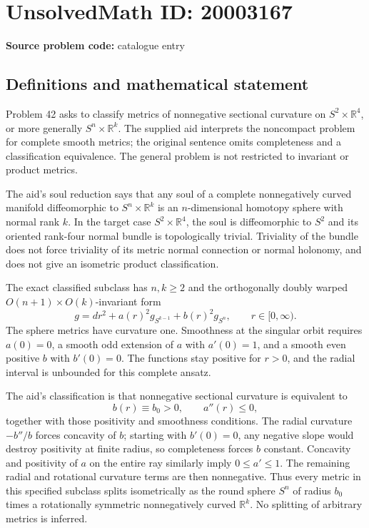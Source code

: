 \documentclass[11pt]{article}
\newcommand{\R}{\mathbb{R}}
\begin{document}
\section*{UnsolvedMath ID: 20003167}
\textbf{Source problem code:} catalogue entry
\subsection{Definitions and mathematical statement}
Problem 42 asks to classify metrics of nonnegative sectional curvature on $S^2\times\R^4$, or more generally $S^n\times\R^k$. The supplied aid interprets the noncompact problem for complete smooth metrics; the original sentence omits completeness and a classification equivalence. The general problem is not restricted to invariant or product metrics.

The aid's soul reduction says that any soul of a complete nonnegatively curved manifold diffeomorphic to $S^n\times\R^k$ is an $n$-dimensional homotopy sphere with normal rank $k$. In the target case $S^2\times\R^4$, the soul is diffeomorphic to $S^2$ and its oriented rank-four normal bundle is topologically trivial. Triviality of the bundle does not force triviality of its metric normal connection or normal holonomy, and does not give an isometric product classification.

The exact classified subclass has $n,k\geq2$ and the orthogonally doubly warped $O(n+1)\times O(k)$-invariant form
\[
 g=dr^2+a(r)^2g_{S^{k-1}}+b(r)^2g_{S^n},\qquad r\in[0,\infty).
\]
The sphere metrics have curvature one. Smoothness at the singular orbit requires $a(0)=0$, a smooth odd extension of $a$ with $a'(0)=1$, and a smooth even positive $b$ with $b'(0)=0$. The functions stay positive for $r>0$, and the radial interval is unbounded for this complete ansatz.

The aid's classification is that nonnegative sectional curvature is equivalent to
\[
 b(r)\equiv b_0>0,\qquad a''(r)\leq0,
\]
together with those positivity and smoothness conditions. The radial curvature $-b''/b$ forces concavity of $b$; starting with $b'(0)=0$, any negative slope would destroy positivity at finite radius, so completeness forces $b$ constant. Concavity and positivity of $a$ on the entire ray similarly imply $0\leq a'\leq1$. The remaining radial and rotational curvature terms are then nonnegative. Thus every metric in this specified subclass splits isometrically as the round sphere $S^n$ of radius $b_0$ times a rotationally symmetric nonnegatively curved $\R^k$. No splitting of arbitrary metrics is inferred.
\end{document}
